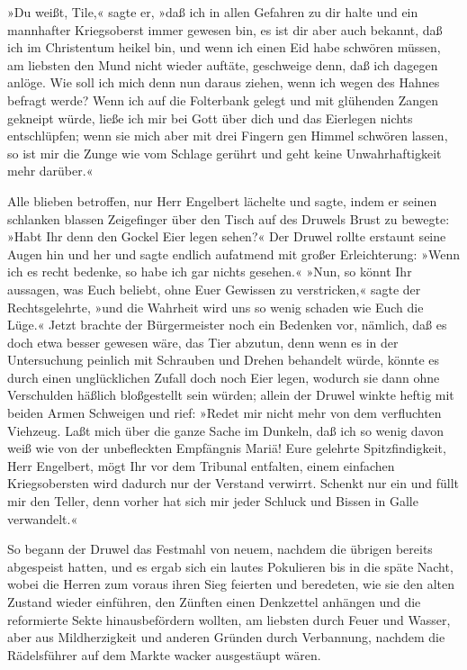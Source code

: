 »Du weißt, Tile,« sagte er, »daß ich in allen Gefahren zu dir halte
und ein mannhafter Kriegsoberst immer gewesen bin, es ist dir aber
auch bekannt, daß ich im Christentum heikel bin, und wenn ich einen
Eid habe schwören müssen, am liebsten den Mund nicht wieder
auftäte, geschweige denn, daß ich dagegen anlöge. Wie soll ich mich
denn nun daraus ziehen, wenn ich wegen des Hahnes befragt werde?
Wenn ich auf die Folterbank gelegt und mit glühenden Zangen
gekneipt würde, ließe ich mir bei Gott über dich und das Eierlegen
nichts entschlüpfen; wenn sie mich aber mit drei Fingern gen Himmel
schwören lassen, so ist mir die Zunge wie vom Schlage gerührt und
geht keine Unwahrhaftigkeit mehr darüber.«

\pagenum{[21]} Alle blieben betroffen, nur Herr Engelbert lächelte
und sagte, indem er seinen schlanken blassen Zeigefinger über den
Tisch auf des Druwels Brust zu bewegte: »Habt Ihr denn den Gockel
Eier legen sehen?« Der Druwel rollte erstaunt seine Augen hin und
her und sagte endlich aufatmend mit großer Erleichterung: »Wenn ich
es recht bedenke, so habe ich gar nichts gesehen.« »Nun, so könnt
Ihr aussagen, was Euch beliebt, ohne Euer Gewissen zu verstricken,«
sagte der Rechtsgelehrte, »und die Wahrheit wird uns so wenig
schaden wie Euch die Lüge.« Jetzt brachte der Bürgermeister noch
ein Bedenken vor, nämlich, daß es doch etwa besser gewesen wäre,
das Tier abzutun, denn wenn es in der Untersuchung peinlich mit
Schrauben und Drehen behandelt würde, könnte es durch einen
unglücklichen Zufall doch noch Eier legen, wodurch sie dann ohne
Verschulden häßlich bloßgestellt sein würden; allein der Druwel
winkte heftig mit beiden Armen Schweigen und rief: »Redet mir nicht
mehr von dem verfluchten Viehzeug. Laßt mich über die ganze Sache
im Dunkeln, daß ich so wenig davon weiß wie von der unbefleckten
Empfängnis Mariä! Eure gelehrte Spitzfindigkeit, Herr Engelbert,
mögt Ihr vor dem Tribunal entfalten, einem einfachen Kriegsobersten
wird dadurch nur der Verstand verwirrt. Schenkt nur ein und füllt
mir den Teller, denn vorher hat sich mir jeder Schluck und Bissen
in Galle verwandelt.«

So begann der Druwel das Festmahl von neuem, nachdem die übrigen
bereits abgespeist hatten, und es ergab sich ein lautes Pokulieren
bis in die späte Nacht, wobei die Herren zum voraus ihren Sieg
feierten und beredeten, wie sie den alten Zustand wieder einführen,
den Zünften einen Denkzettel anhängen und die reformierte Sekte
\pagenum{[22]} hinausbefördern wollten, am liebsten durch Feuer und
Wasser, aber aus Mildherzigkeit und anderen Gründen durch
Verbannung, nachdem die Rädelsführer auf dem Markte wacker
ausgestäupt wären.


